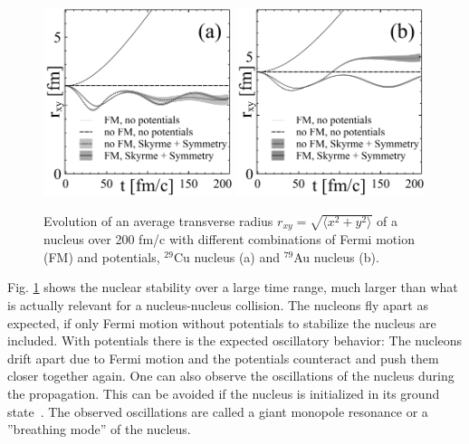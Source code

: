 \begin{figure}
  \centering
  \includegraphics[width=0.49\textwidth]{plots/smash/Cu_nucleus_stability.pdf}
  \includegraphics[width=0.49\textwidth]{plots/smash/Au_nucleus_stability.pdf}
  \caption{Evolution of an average transverse radius $r_{xy} = \sqrt{\langle x^2
           + y^2 \rangle}$ of a nucleus over 200 fm/c with different combinations of Fermi
           motion (FM) and potentials, $^{29}$Cu nucleus (a) and $^{79}$Au nucleus (b).}
  \label{fig:stability}
\end{figure}

Fig. \ref{fig:stability} shows the nuclear stability over a large time range,
much larger than what is actually relevant for a nucleus-nucleus collision. The
nucleons fly apart as expected, if only Fermi motion without potentials to
stabilize the nucleus are included. With potentials there is the expected
oscillatory behavior: The nucleons drift apart due to Fermi motion and the
potentials counteract and push them closer together again. One can also
observe the oscillations of the nucleus during the propagation. This can be avoided
if the nucleus is initialized in its ground state~\cite{Gaitanos:2010fd}.
The observed oscillations are called a giant monopole resonance or a
''breathing mode'' of the nucleus.

